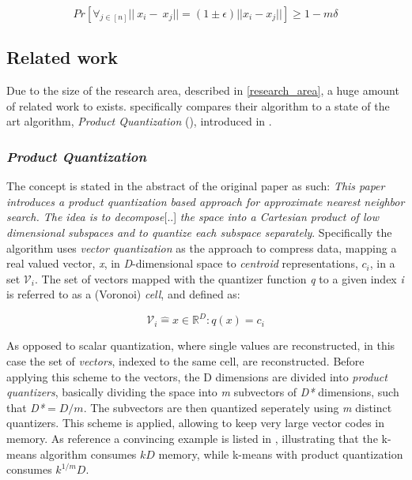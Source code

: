 \begin{equation}
Pr[\forall{}_{j\in{}[n]} ||~x_i-~x_j||= (1\pm\epsilon)||x_i-x_j||] \geq 1 - m\delta
\end{equation}

\subsection{Related work}
\label{state_of_the_art}
Due to the size of the research area, described in \ref{research_area}, a huge amount of related work to \qs{} exists. \cite{wagner17} specifically compares their algorithm to a state of the art algorithm, \textit{Product Quantization} (\pq{}), introduced in \cite{schmid9}. %

\subsubsection{\textit{Product Quantization}}
The \pq{} concept is stated in the abstract of the original paper as such: \textit{This paper introduces a product quantization based approach for approximate nearest neighbor search. The idea is to decompose}[..] \textit{the space into a Cartesian product of low dimensional subspaces and to quantize each subspace separately}. Specifically the algorithm uses \textit{vector quantization} as the approach to compress data, mapping a real valued vector, \textit{x}, in \textit{D}-dimensional space to \textit{centroid} representations, \textit{$c_i$}, in a set $\mathcal{V}_i$\cite[p.3 II-A]{schmid9}. The set of vectors mapped with the quantizer function \textit{q} to a given index \textit{i} is referred to as a (Voronoi) \textit{cell}, and defined as:

\begin{equation}
	\mathcal{V}_i\mathrel{\hat=}{x\in\mathbb{R}^D : q(x)=c_i}
\end{equation}

As opposed to scalar quantization, where single values are reconstructed, in this case the set of \textit{vectors}, indexed to the same cell, are reconstructed. Before applying this scheme to the vectors, the D dimensions are divided into \textit{product quantizers}, basically dividing the space into \textit{m} subvectors of \textit{D*} dimensions, such that \textit{D*$=D/m$}\cite[p.3 II-B]{schmid9}. The subvectors are then quantized seperately using \textit{m} distinct quantizers. This scheme is applied, allowing to keep very large vector codes in memory. As reference a convincing example is listed in \cite[Table I, p. 4]{schmid9}, illustrating that the k-means algorithm consumes $kD$ memory, while k-means with product quantization consumes  $k^{1/m}D$.

